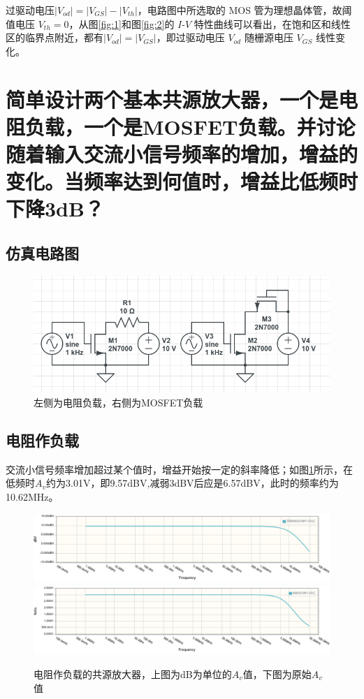 \documentclass[a4paper]{article}
\begin{document}
过驱动电压$|V_{od}|=|V_{GS}|−|V_{th}|$，电路图中所选取的 MOS 管为理想晶体管，故阈值电压 $V_{th}=0$，从图\ref{fig:1}和图\ref{fig:2}的 $I$-$V$ 特性曲线可以看出，在饱和区和线性区的临界点附近，都有$|V_{od}|=|V_{GS}|$，即过驱动电压 $V_{od}$ 随栅源电压 $V_{GS}$ 线性变化。

\section{简单设计两个基本共源放大器，一个是电阻负载，一个是MOSFET负载。并讨论随着输入交流小信号频率的增加，增益的变化。当频率达到何值时，增益比低频时下降3dB？}
\subsection{仿真电路图}
\begin{figure}[htp]
\centering
\includegraphics[width=1.0\linewidth]{3.png}
\caption{左侧为电阻负载，右侧为MOSFET负载}
\end{figure}
\subsection{电阻作负载}
交流小信号频率增加超过某个值时，增益开始按一定的斜率降低；如图\ref{fig:3}所示，在低频时$A_v$约为3.01V，即9.57dBV,减弱3dBV后应是6.57dBV，此时的频率约为10.62MHz。
\begin{figure}[htp]
\centering
\includegraphics[width=1.0\linewidth]{35.png}
\includegraphics[width=1.0\linewidth]{36.png}
\caption{电阻作负载的共源放大器，上图为dB为单位的$A_v$值，下图为原始$A_v$值}
\label{fig:3}
\end{figure}
\end{document}
